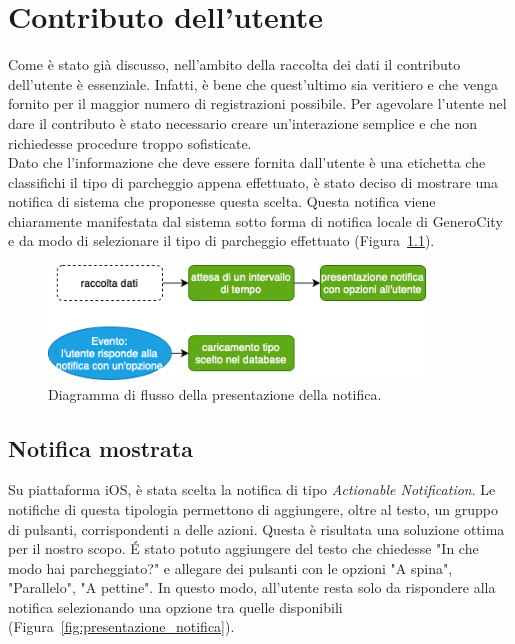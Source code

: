\chapter{Contributo dell'utente}

Come è stato già discusso, nell'ambito della raccolta dei dati il contributo dell'utente
è essenziale. Infatti, è bene che quest'ultimo sia veritiero e che venga fornito per
il maggior numero di registrazioni possibile. Per agevolare l'utente nel dare il contributo
è stato necessario creare un'interazione semplice e che non richiedesse procedure troppo 
sofisticate.\\
Dato che l'informazione che deve essere fornita dall'utente è una etichetta che classifichi
il tipo di parcheggio appena effettuato, è stato deciso di mostrare una notifica di sistema
che proponesse questa scelta. Questa notifica viene chiaramente manifestata dal sistema
sotto forma di notifica locale di GeneroCity e da modo di selezionare il tipo di parcheggio
effettuato (Figura~\ref{fig:flow_diagram_presentazione_notifica}).
\begin{figure}
    \centering
    \includegraphics[width=10cm]{images/flow_diagram_presentazione_notifica.png}
    \caption{Diagramma di flusso della presentazione della notifica.}
    \label{fig:flow_diagram_presentazione_notifica}
\end{figure}

\section{Notifica mostrata}

Su piattaforma iOS, è stata scelta la notifica di tipo \emph{Actionable Notification}.
Le notifiche di questa tipologia permettono di aggiungere, oltre al testo, un gruppo 
di pulsanti, corrispondenti a delle azioni. Questa è risultata una soluzione ottima per 
il nostro scopo. \'E stato potuto aggiungere del testo che chiedesse "In che modo hai
parcheggiato?" e allegare dei pulsanti con le opzioni "A spina", "Parallelo", "A pettine".
In questo modo, all'utente resta solo da rispondere alla notifica selezionando una 
opzione tra quelle disponibili (Figura~\ref{fig:presentazione_notifica}).


